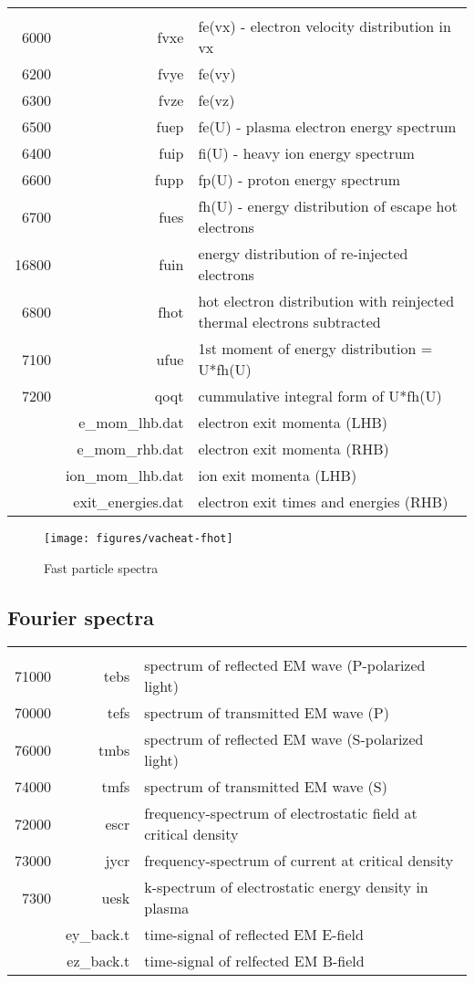 \documentclass[11pt]{article}
\begin{document}
\begin{tabular}{rrl}
\hline\\
6000 & fvxe& fe(vx) - electron velocity distribution in vx \\
6200 & fvye& fe(vy) \\
6300 & fvze& fe(vz) \\
6500 & fuep& fe(U) - plasma electron energy spectrum \\
6400 & fuip& fi(U) - heavy ion energy spectrum \\
6600 & fupp& fp(U) - proton energy spectrum \\
6700 & fues& fh(U) - energy distribution of escape hot electrons \\ 
16800 & fuin& energy distribution of re-injected electrons \\
6800 & fhot& hot electron distribution with reinjected thermal electrons subtracted\\ 
7100 & ufue& 1st moment of energy distribution = U*fh(U) \\
7200 & qoqt& cummulative integral form of U*fh(U) \\
& e\_mom\_lhb.dat& electron exit momenta (LHB) \\
& e\_mom\_rhb.dat& electron exit momenta (RHB) \\
& ion\_mom\_lhb.dat& ion exit momenta (LHB) \\
& exit\_energies.dat& electron exit times and energies (RHB)
\end{tabular}

\begin{figure}[ht]
\begin{center}
\texttt{[image: figures/vacheat-fhot]}
\caption{Fast particle spectra}
\end{center}
\end{figure}


\subsection{Fourier spectra} 
\begin{tabular}{rrl}
\hline\\ 
71000 & tebs& spectrum of reflected EM wave (P-polarized light) \\
70000 & tefs& spectrum of transmitted EM wave (P) \\
76000 & tmbs& spectrum of reflected EM wave (S-polarized light)\\ 
74000 & tmfs& spectrum of transmitted EM wave (S) \\
72000 & escr& frequency-spectrum of electrostatic field at critical density \\
73000 & jycr& frequency-spectrum of current at critical density \\
7300 & uesk& k-spectrum of electrostatic energy density in plasma \\
& ey\_back.t& time-signal of reflected EM E-field \\
& ez\_back.t& time-signal of relfected EM B-field
\end{tabular}
\end{document}
